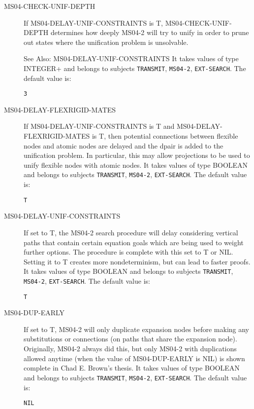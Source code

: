 \begin{description}
\item[MS04-CHECK-UNIF-DEPTH]  
If MS04-DELAY-UNIF-CONSTRAINTS is T, MS04-CHECK-UNIF-DEPTH determines
how deeply MS04-2 will try to unify in order to prune out states where
the unification problem is unsolvable.

See Also: MS04-DELAY-UNIF-CONSTRAINTS
It takes values of type INTEGER+ and belongs to subjects \texttt{TRANSMIT}, \texttt{MS04-2}, \texttt{EXT-SEARCH}.  The default value is: \begin{lstlisting}
3
\end{lstlisting}

\item[MS04-DELAY-FLEXRIGID-MATES]  
If MS04-DELAY-UNIF-CONSTRAINTS is T and MS04-DELAY-FLEXRIGID-MATES is T,
then potential connections between flexible nodes and atomic nodes are delayed
and the dpair is added to the unification problem.  In particular, this may
allow projections to be used to unify flexible nodes with atomic nodes.
It takes values of type BOOLEAN and belongs to subjects \texttt{TRANSMIT}, \texttt{MS04-2}, \texttt{EXT-SEARCH}.  The default value is: \begin{lstlisting}
T
\end{lstlisting}

\item[MS04-DELAY-UNIF-CONSTRAINTS]  
If set to T, the MS04-2 search procedure will delay
considering vertical paths that contain certain equation goals
which are being used to weight further options.  The procedure
is complete with this set to T or NIL.  Setting it to T creates
more nondeterminism, but can lead to faster proofs.
It takes values of type BOOLEAN and belongs to subjects \texttt{TRANSMIT}, \texttt{MS04-2}, \texttt{EXT-SEARCH}.  The default value is: \begin{lstlisting}
T
\end{lstlisting}

\item[MS04-DUP-EARLY]  
If set to T, MS04-2 will only duplicate expansion nodes before making
any substitutions or connections (on paths that share the expansion
node).  Originally, MS04-2 always did this, but only MS04-2 with
duplications allowed anytime (when the value of MS04-DUP-EARLY is NIL)
is shown complete in Chad E. Brown's thesis.
It takes values of type BOOLEAN and belongs to subjects \texttt{TRANSMIT}, \texttt{MS04-2}, \texttt{EXT-SEARCH}.  The default value is: \begin{lstlisting}
NIL
\end{lstlisting}


\end{description}

